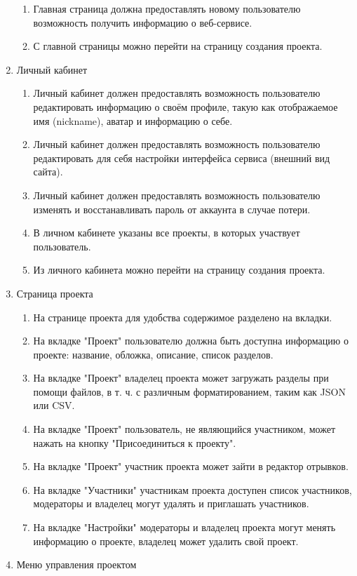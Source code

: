 \documentclass[a4paper,12pt]{article}
\begin{document}
\begin{enumerate}
\begin{enumerate}
	\item Главная страница должна предоставлять новому пользователю возможность получить информацию о веб-сервисе.
	\item С главной страницы можно перейти на страницу создания проекта.
\end{enumerate}
\item Личный кабинет
\begin{enumerate}
	\item Личный кабинет должен предоставлять возможность пользователю редактировать информацию о своём профиле, такую как отображаемое имя (nickname), аватар и информацию о себе.
	\item Личный кабинет должен предоставлять возможность пользователю редактировать для себя настройки интерфейса сервиса (внешний вид сайта).
	\item Личный кабинет должен предоставлять возможность пользователю изменять и восстанавливать пароль от аккаунта в случае потери.
	\item В личном кабинете указаны все проекты, в которых участвует пользователь.
	\item Из личного кабинета можно перейти на страницу создания проекта.
\end{enumerate}
\item Страница проекта
\begin{enumerate}
	\item На странице проекта для удобства содержимое разделено на вкладки.
	\item На вкладке "Проект" пользователю должна быть доступна информацию о проекте: название, обложка, описание, список разделов.
	\item На вкладке "Проект" владелец проекта может загружать разделы при помощи файлов, в т. ч. с различным форматированием, таким как JSON или CSV.
	\item На вкладке "Проект" пользователь, не являющийся участником, может нажать на кнопку "Присоединиться к проекту".
	\item На вкладке "Проект" участник проекта может зайти в редактор отрывков.
	\item На вкладке "Участники" участникам проекта доступен список участников, модераторы и владелец могут удалять и приглашать участников.
	\item На вкладке "Настройки" модераторы и владелец проекта могут менять информацию о проекте, владелец может удалить свой проект.
\end{enumerate}
\item Меню управления проектом

\end{enumerate}
\end{document}
